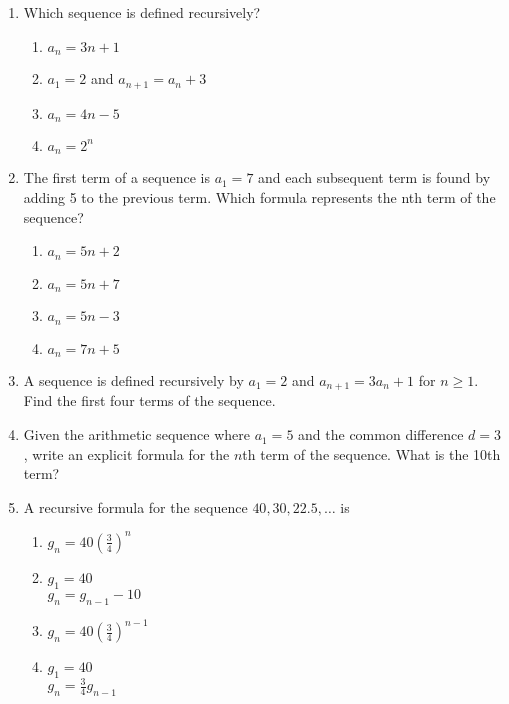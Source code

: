 \documentclass[12pt, twoside]{article}
\begin{document}
\begin{enumerate}[itemsep=0.5cm]
\newpage

\item Which sequence is defined recursively?
\begin{enumerate}
    \item $a_n = 3n + 1$
    \item $a_1 = 2$ and $a_{n+1} = a_n + 3$
    \item $a_n = 4n - 5$
    \item $a_n = 2^n$
\end{enumerate}

\item The first term of a sequence is $a_1 = 7$ and each subsequent term is found by adding 5 to the previous term. Which formula represents the nth term of the sequence?
\begin{enumerate}
    \item $a_n = 5n + 2$
    \item $a_n = 5n + 7$
    \item $a_n = 5n - 3$
    \item $a_n = 7n + 5$
\end{enumerate}

\item A sequence is defined recursively by \( a_1 = 2 \) and \( a_{n+1} = 3a_n + 1 \) for \( n \geq 1 \). Find the first four terms of the sequence.

\item Given the arithmetic sequence where \( a_1 = 5 \) and the common difference \( d = 3 \), write an explicit formula for the \( n \)th term of the sequence. What is the 10th term?


\newpage

\item A recursive formula for the sequence $40, 30, 22.5, \ldots$ is
\begin{enumerate}
    \item $g_n = 40 \left( \frac{3}{4} \right)^n$
    \item $g_1 = 40$ \\ $g_n = g_{n-1} -10$
    \item $g_n = 40 \left( \frac{3}{4} \right)^{n-1}$
    \item $g_1 = 40$ \\ $g_n = \frac{3}{4} g_{n-1}$
\end{enumerate}



\end{enumerate}
\end{document}
